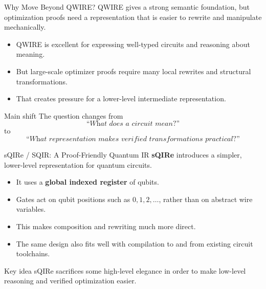 \documentclass[aspectratio=169]{beamer}
\begin{document}
\begin{frame}{Why Move Beyond QWIRE?}
\justifying
QWIRE gives a strong semantic foundation, but optimization proofs need a representation
that is easier to rewrite and manipulate mechanically.

\vspace{0.7em}
\begin{itemize}
    \item QWIRE is excellent for expressing well-typed circuits and reasoning about meaning.
    \item But large-scale optimizer proofs require many local rewrites and structural transformations.
    \item That creates pressure for a lower-level intermediate representation.
\end{itemize}

\vspace{0.7em}
\begin{alertblock}{Main shift}
The question changes from
\[
\textit{``What does a circuit mean?''}
\]
to
\[
\textit{``What representation makes verified transformations practical?''}
\]
\end{alertblock}
\end{frame}
\begin{frame}{sQIRe / SQIR: A Proof-Friendly Quantum IR}
\justifying
\textbf{sQIRe} introduces a simpler, lower-level representation for quantum circuits.

\vspace{0.7em}
\begin{itemize}
    \item It uses a \textbf{global indexed register} of qubits.
    \item Gates act on qubit positions such as \(0,1,2,\dots\), rather than on abstract wire variables.
    \item This makes composition and rewriting much more direct.
    \item The same design also fits well with compilation to and from existing circuit toolchains.
\end{itemize}

\vspace{0.7em}
\begin{block}{Key idea}
sQIRe sacrifices some high-level elegance in order to make low-level reasoning and verified optimization easier.
\end{block}
\end{frame}
\end{document}

